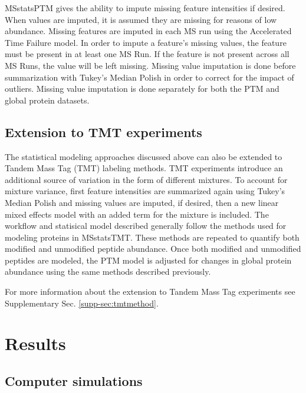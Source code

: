 \documentclass[mcp]{article}
\numberwithin{figure}{section} %
\numberwithin{table}{section}
\begin{document}
MSstatsPTM gives the ability to impute missing feature intensities if desired. When values are imputed, it is assumed they are missing for reasons of low abundance. Missing features are imputed in each MS run using the Accelerated Time Failure model.\cite{Tukey:1977} In order to impute a feature's missing values, the feature must be present in at least one MS Run. If the feature is not present across all MS Runs, the value will be left missing. Missing value imputation is done before summarization with Tukey's Median Polish in order to correct for the impact of outliers. Missing value imputation is done separately for both the PTM and global protein datasets.

\subsection*{Extension to TMT experiments}

The statistical modeling approaches discussed above can also be extended to Tandem Mass Tag (TMT) labeling methods. TMT experiments introduce an additional source of variation in the form of different mixtures. To account for mixture variance, first feature intensities are summarized again using Tukey's Median Polish and missing values are imputed, if desired, then a new linear mixed effects model with an added term for the mixture is included. The workflow and statisical model described generally follow the methods used for modeling proteins in MSstatsTMT. \cite{Huang:2020} These methods are repeated to quantify both modified and unmodified peptide abundance. Once both modified and unmodified peptides are modeled, the PTM model is adjusted for changes in global protein abundance using the same methods described previously. 

For more information about the extension to Tandem Mass Tag experiments see Supplementary Sec. \ref{supp-sec:tmtmethod}.

\section{Results}

\subsection*{Computer simulations}
\label{sec:comp_sim}
\end{document}
